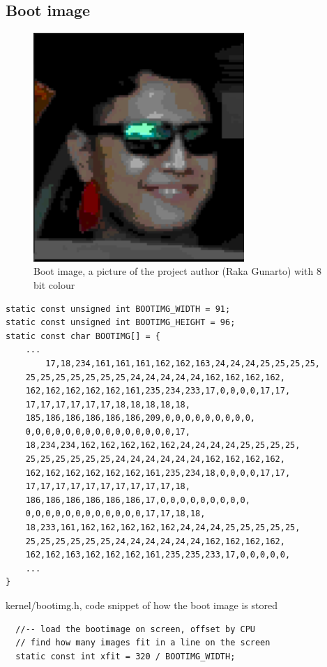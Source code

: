 \begin{appendices}
\section{Boot image}
\label{appendix:c:5}
\begin{figure}[H]
    \centering
    \includegraphics[width=8cm]{face.png}
    \caption{Boot image, a picture of the project author (Raka Gunarto) with 8 bit colour}
\end{figure}
\begin{listing}[H]
    \begin{verbatim}
static const unsigned int BOOTIMG_WIDTH = 91;
static const unsigned int BOOTIMG_HEIGHT = 96;
static const char BOOTIMG[] = {
    ...
        17,18,234,161,161,161,162,162,163,24,24,24,25,25,25,25,
	25,25,25,25,25,25,25,24,24,24,24,24,162,162,162,162,
	162,162,162,162,162,161,235,234,233,17,0,0,0,0,17,17,
	17,17,17,17,17,17,18,18,18,18,18,
	185,186,186,186,186,186,209,0,0,0,0,0,0,0,0,0,
	0,0,0,0,0,0,0,0,0,0,0,0,0,0,0,17,
	18,234,234,162,162,162,162,162,24,24,24,24,25,25,25,25,
	25,25,25,25,25,25,24,24,24,24,24,24,162,162,162,162,
	162,162,162,162,162,162,161,235,234,18,0,0,0,0,17,17,
	17,17,17,17,17,17,17,17,17,17,18,
	186,186,186,186,186,186,17,0,0,0,0,0,0,0,0,0,
	0,0,0,0,0,0,0,0,0,0,0,0,17,17,18,18,
	18,233,161,162,162,162,162,162,24,24,24,25,25,25,25,25,
	25,25,25,25,25,25,24,24,24,24,24,24,162,162,162,162,
	162,162,163,162,162,162,161,235,235,233,17,0,0,0,0,0,
    ...
}
    \end{verbatim}
    \caption{kernel/bootimg.h, code snippet of how the boot image is stored}
\end{listing}
\begin{listing}[H]
    \begin{verbatim}
  //-- load the bootimage on screen, offset by CPU
  // find how many images fit in a line on the screen
  static const int xfit = 320 / BOOTIMG_WIDTH;


\end{verbatim}
\end{listing}
\end{appendices}
